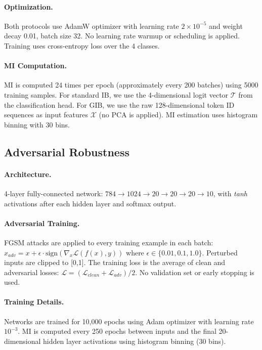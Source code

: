 \documentclass{article}
\theoremstyle{definition}
\theoremstyle{remark}
\begin{document}
\paragraph{Optimization.} Both protocols use AdamW optimizer with learning rate $2 \times 10^{-5}$ and weight decay 0.01, batch size 32. No learning rate warmup or scheduling is applied. Training uses cross-entropy loss over the 4 classes.

\paragraph{MI Computation.} MI is computed 24 times per epoch (approximately every 200 batches) using 5000 training samples. For standard IB, we use the 4-dimensional logit vector $\mathcal{T}$ from the classification head. For GIB, we use the raw 128-dimensional token ID sequences as input features $\mathcal{X}$ (no PCA is applied). MI estimation uses histogram binning with 30 bins.

\subsection{Adversarial Robustness}
\label{app:adversarial}

\paragraph{Architecture.} 4-layer fully-connected network: $784 \rightarrow 1024 \rightarrow 20 \rightarrow 20 \rightarrow 20 \rightarrow 10$, with \textit{tanh} activations after each hidden layer and softmax output. 

\paragraph{Adversarial Training.} FGSM attacks are applied to every training example in each batch: $x_{adv} = x + \epsilon \cdot \text{sign}(\nabla_x \mathcal{L}(f(x), y))$ where $\epsilon \in \{0.01, 0.1, 1.0\}$. Perturbed inputs are clipped to [0,1]. The training loss is the average of clean and adversarial losses: $\mathcal{L} = (\mathcal{L}_{clean} + \mathcal{L}_{adv})/2$. No validation set or early stopping is used.

\paragraph{Training Details.} Networks are trained for 10,000 epochs using Adam optimizer with learning rate $10^{-3}$. MI is computed every 250 epochs between inputs and the final 20-dimensional hidden layer activations using histogram binning (30 bins).
\end{document}
